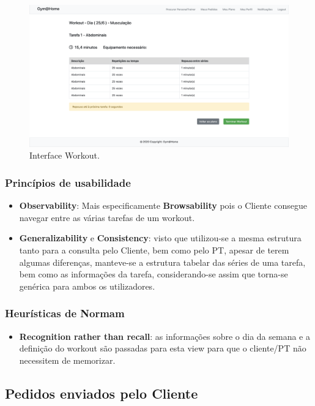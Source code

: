 \begin{figure}[H]
    \centering
    \includegraphics[scale=0.25]{images/interfaces/client_workout.png}
    \caption{Interface Workout.}
    \label{fig:interfaceworkout}
\end{figure}

\subsubsection{Princípios de usabilidade}
\begin{itemize}
    \item \textbf{Observability}: Mais especificamente \textbf{Browsability} pois o Cliente consegue navegar entre as várias tarefas de um workout.
    
    \item \textbf{Generalizability} e \textbf{Consistency}: visto que utilizou-se a mesma estrutura tanto para a consulta pelo Cliente, bem como pelo PT, apesar de terem algumas diferenças, manteve-se a estrutura tabelar das séries de uma tarefa, bem como as informações da tarefa, considerando-se assim que torna-se genérica para ambos os utilizadores.
\end{itemize}

\subsubsection{Heurísticas de Normam}
\begin{itemize}
    \item \textbf{Recognition rather than recall}: as informações sobre o dia da semana e a definição do workout são passadas para esta view para que o cliente/PT não necessitem de memorizar.
\end{itemize}

\subsection{Pedidos enviados pelo Cliente}
\label{subsec:pedidos}

